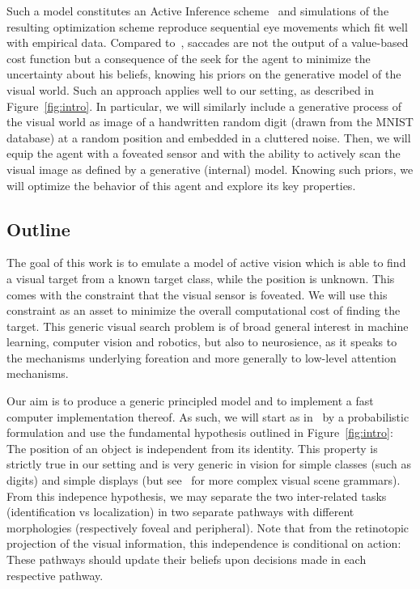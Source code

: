 Such a model constitutes an Active Inference scheme~\citep{Mirza18} and simulations of the resulting optimization scheme reproduce sequential eye movements which fit well with empirical data. Compared to~\citet{Najemnik05}, saccades are not the output of a value-based cost function but a consequence of the seek for the agent to minimize the uncertainty about his beliefs, knowing his priors on the generative model of the visual world. Such an approach applies well to our setting, as described in Figure~\ref{fig:intro}. In particular, we will similarly include a generative process of the visual world as image of a handwritten random digit (drawn from the MNIST database) at a random position and embedded in a cluttered noise. Then, we will equip the agent with a foveated sensor and with the ability to actively scan the visual image as defined by a generative (internal) model. Knowing such priors, we will optimize the behavior of this agent and explore its key properties.

\subsection{Outline}
\fi
The goal of this work is to emulate a model of active vision which is able to find a visual target from a known target class, while the position is unknown. This comes with the constraint that the visual sensor is foveated. We will use this constraint as an asset to minimize the overall computational cost of finding the target. This generic visual search problem is of broad general interest in machine learning, computer vision and robotics, but also to neurosience, as it speaks to the mechanisms underlying foreation and more generally to low-level attention mechanisms.

Our aim is to produce a generic principled model and to implement a fast computer implementation thereof. As such, we will start as in~\citep{Friston12} by a probabilistic formulation and use the fundamental hypothesis outlined in Figure~\ref{fig:intro}: The position of an object is independent from its identity. This property is strictly true in our setting and is very generic in vision for simple classes (such as digits) and simple displays (but see~\citep{Vo12} for more complex visual scene grammars). From this indepence hypothesis, we may separate the two inter-related tasks (identification vs localization) in two separate pathways with different morphologies (respectively foveal and peripheral). Note that from the retinotopic projection of the visual information, this independence is conditional on action: These pathways should update their beliefs upon decisions made in each respective pathway.

